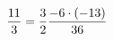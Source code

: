 \documentclass[preview]{standalone}
\begin{document}
\begin{align*}
\special{dvisvgm:raw <g id='unique000'>}\frac{11}{3} = \frac{3}{2} \frac{-6 \cdot (-13)}{36}\special{dvisvgm:raw </g>}
\end{align*}
\end{document}
